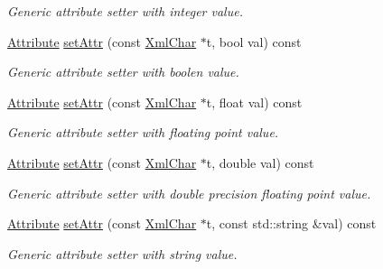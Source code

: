 \begin{DoxyCompactItemize}
\begin{DoxyCompactList}\small\item\em Generic attribute setter with integer value. \item\end{DoxyCompactList}\item 
\hyperlink{namespace_d_d4hep_1_1_x_m_l_a5c19b7116be99d69b4b22d911357baaf}{Attribute} \hyperlink{class_d_d4hep_1_1_x_m_l_1_1_handle__t_a5126495197f41fe6f88603eb035d4858}{setAttr} (const \hyperlink{namespace_d_d4hep_1_1_x_m_l_a09e5d9cc86ed782f6826dfe0778c1815}{XmlChar} $\ast$t, bool val) const 
\begin{DoxyCompactList}\small\item\em Generic attribute setter with boolen value. \item\end{DoxyCompactList}\item 
\hyperlink{namespace_d_d4hep_1_1_x_m_l_a5c19b7116be99d69b4b22d911357baaf}{Attribute} \hyperlink{class_d_d4hep_1_1_x_m_l_1_1_handle__t_aab5ad5247e83023930ead951d289cf99}{setAttr} (const \hyperlink{namespace_d_d4hep_1_1_x_m_l_a09e5d9cc86ed782f6826dfe0778c1815}{XmlChar} $\ast$t, float val) const 
\begin{DoxyCompactList}\small\item\em Generic attribute setter with floating point value. \item\end{DoxyCompactList}\item 
\hyperlink{namespace_d_d4hep_1_1_x_m_l_a5c19b7116be99d69b4b22d911357baaf}{Attribute} \hyperlink{class_d_d4hep_1_1_x_m_l_1_1_handle__t_a446c25314d97b2f60d7c68f1d6460360}{setAttr} (const \hyperlink{namespace_d_d4hep_1_1_x_m_l_a09e5d9cc86ed782f6826dfe0778c1815}{XmlChar} $\ast$t, double val) const 
\begin{DoxyCompactList}\small\item\em Generic attribute setter with double precision floating point value. \item\end{DoxyCompactList}\item 
\hyperlink{namespace_d_d4hep_1_1_x_m_l_a5c19b7116be99d69b4b22d911357baaf}{Attribute} \hyperlink{class_d_d4hep_1_1_x_m_l_1_1_handle__t_a226d6ea145e4c0c42240f3205c8cfb8c}{setAttr} (const \hyperlink{namespace_d_d4hep_1_1_x_m_l_a09e5d9cc86ed782f6826dfe0778c1815}{XmlChar} $\ast$t, const std::string \&val) const 
\begin{DoxyCompactList}\small\item\em Generic attribute setter with string value. \item\end{DoxyCompactList}\item 

\end{DoxyCompactItemize}
